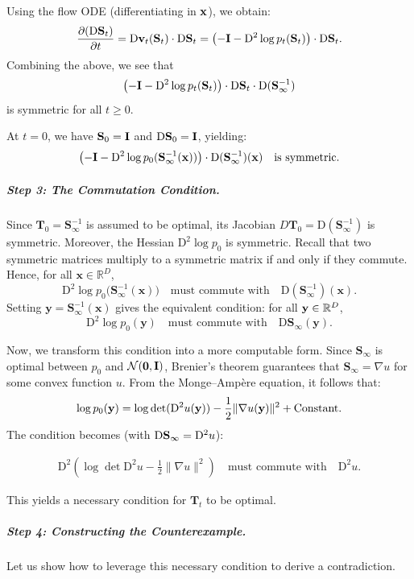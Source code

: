 Using the flow ODE (differentiating in ${\mathbf{x}}$), we obtain:
\[
\frac{\partial (\mathrm{D}\mathbf{S}_t)}{\partial t}
= \mathrm{D}{\mathbf{v}}_t(\mathbf{S}_t) \cdot \mathrm{D}\mathbf{S}_t
= \left( -{\mathbf{I}} - \mathrm{D}^2 \log p_t(\mathbf{S}_t) \right) \cdot \mathrm{D}\mathbf{S}_t.
\]
Combining the above, we see that
\[
\left( -{\mathbf{I}} - \mathrm{D}^2 \log p_t(\mathbf{S}_t) \right) \cdot\mathrm{D}\mathbf{S}_t \cdot \mathrm{D} (\mathbf{S}_\infty^{-1})
\]
is symmetric for all $t\geq 0$.

At $t = 0$, we have $\mathbf{S}_0 = {\mathbf{I}}$ and $\mathrm{D}\mathbf{S}_0 = {\mathbf{I}}$, yielding:
\[
\left( -{\mathbf{I}} - \mathrm{D}^2 \log p_0(\mathbf{S}_\infty^{-1}({\mathbf{x}})) \right) \cdot \mathrm{D} (\mathbf{S}_\infty^{-1})({\mathbf{x}}) \quad \text{is symmetric}.
\]

\subparagraph{Step 3: The Commutation Condition.}  Since $\mathbf{T}_0 = \mathbf{S}_\infty^{-1}$ is assumed to be optimal, its Jacobian $D\mathbf{T}_0 = \mathrm{D}(\mathbf{S}_\infty^{-1})$ is symmetric.  Moreover, the Hessian $\mathrm{D}^2\log p_0$ is symmetric.  Recall that two symmetric matrices multiply to a symmetric matrix if and only if they commute.  Hence, for all $\mathbf{x}\in\mathbb{R}^D$,
\[
\mathrm{D}^2\log p_0\bigl(\mathbf{S}_\infty^{-1}(\mathbf{x})\bigr)
\quad\text{must commute with}\quad
\mathrm{D}(\mathbf{S}_\infty^{-1})(\mathbf{x}) .
\]
Setting $\mathbf{y}=\mathbf{S}_\infty^{-1}(\mathbf{x})$ gives the equivalent condition: for all ${\mathbf{y}}\in\mathbb{R}^D$,
\[
\mathrm{D}^2\log p_0(\mathbf{y})
\quad\text{must commute with}\quad
\mathrm{D}\mathbf{S}_\infty(\mathbf{y}) .
\]


Now, we transform this condition into a more computable form.  
Since $\mathbf{S}_\infty$ is optimal between $p_0$ and $\mathcal{N}(\bm{0},{\mathbf{I}})$, Brenier’s theorem guarantees that $\mathbf{S}_\infty = \nabla u$ for some convex function $u$.  From the Monge–Ampère equation, it follows that:
\[
\log p_0({\mathbf{y}}) = \log \det(\mathrm{D}^2 u({\mathbf{y}})) - \frac{1}{2} \|\nabla u({\mathbf{y}})\|^2 + \text{Constant}.
\]
The condition becomes (with $\mathrm{D}{\mathbf{S}}_\infty = \mathrm{D}^2 u$): 
\begin{mdframed}
\begin{align}\label{eq:necessary-ot}
\mathrm{D}^2 \left(\log \det \mathrm{D}^2 u - \frac{1}{2} \|\nabla u\|^2\right)
\quad\text{must commute with}\quad
\mathrm{D}^2 u.
\end{align}
\end{mdframed}
This yields a necessary condition for $\mathbf{T}_t$ to be optimal.
\subparagraph{Step 4: Constructing the Counterexample.} Let us show how to leverage this necessary condition to derive a contradiction.

